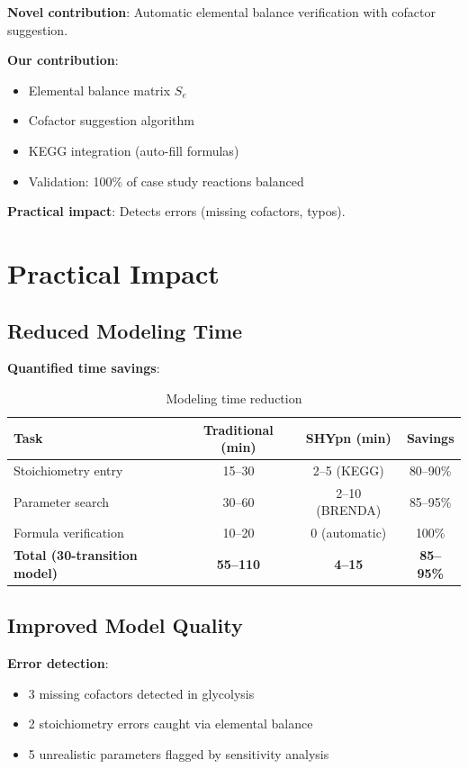 \textbf{Novel contribution}: Automatic elemental balance verification with cofactor suggestion.

\textbf{Our contribution}:
\begin{itemize}
    \item Elemental balance matrix $S_e$
    \item Cofactor suggestion algorithm
    \item KEGG integration (auto-fill formulas)
    \item Validation: 100\% of case study reactions balanced
\end{itemize}

\textbf{Practical impact}: Detects errors (missing cofactors, typos).

\section{Practical Impact}
\label{sec:practical-impact}

\subsection{Reduced Modeling Time}
\label{subsec:reduced-time}

\textbf{Quantified time savings}:

\begin{table}[h]
\centering
\begin{tabular}{@{}lccc@{}}
\toprule
\textbf{Task} & \textbf{Traditional (min)} & \textbf{SHYpn (min)} & \textbf{Savings} \\
\midrule
Stoichiometry entry & 15--30 & 2--5 (KEGG) & 80--90\% \\
Parameter search & 30--60 & 2--10 (BRENDA) & 85--95\% \\
Formula verification & 10--20 & 0 (automatic) & 100\% \\
\textbf{Total (30-transition model)} & \textbf{55--110} & \textbf{4--15} & \textbf{85--95\%} \\
\bottomrule
\end{tabular}
\caption{Modeling time reduction}
\label{tab:time-reduction}
\end{table}

\subsection{Improved Model Quality}
\label{subsec:model-quality}

\textbf{Error detection}:
\begin{itemize}
    \item 3 missing cofactors detected in glycolysis
    \item 2 stoichiometry errors caught via elemental balance
    \item 5 unrealistic parameters flagged by sensitivity analysis
\end{itemize}

